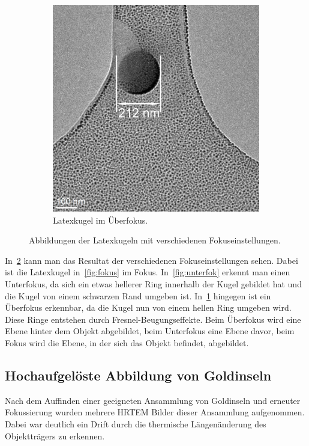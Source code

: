 \documentclass[slug=TEM, room=IFW, supervisor=?, coursedate=23.\ 01.\ 2020]{../../Lab_Report_LaTeX/lab_report}
\begin{document}
\begin{figure}[h]
	\begin{subfigure}{.29\textwidth}
		\includegraphics[width=.8\textwidth]{../messungen/Fokus_Latex/auswertung/Fokus-20m.jpg}
		\caption{Latexkugel im Überfokus.}
		\label{fig:uberfok}
	\end{subfigure}
\caption{Abbildungen der Latexkugeln mit verschiedenen Fokuseinstellungen.}
\label{fig:latex}
\end{figure}

In~\ref{fig:latex} kann man das Resultat der verschiedenen Fokuseinstellungen sehen. Dabei ist
die Latexkugel in~\ref{fig:fokus} im Fokus. In~\ref{fig:unterfok} erkennt man einen Unterfokus,
da sich ein etwas hellerer Ring innerhalb der Kugel gebildet hat und die Kugel von einem 
schwarzen Rand umgeben ist. In~\ref{fig:uberfok} hingegen ist ein Überfokus erkennbar, da die
Kugel nun von einem hellen Ring umgeben wird. Diese Ringe entstehen durch Fresnel-Beugungseffekte.
Beim Überfokus wird eine Ebene hinter dem Objekt abgebildet, beim Unterfokus eine Ebene davor,
beim Fokus wird die Ebene, in der sich das Objekt befindet, abgebildet.

\subsection{Hochaufgel\"oste Abbildung von Goldinseln}
\label{sec:hrtem}

Nach dem Auffinden einer geeigneten Ansammlung von Goldinseln und erneuter
Fokussierung wurden mehrere HRTEM Bilder dieser Ansammlung
aufgenommen. Dabei war deutlich ein Drift durch die thermische
L\"angen\"anderung des Objekttr\"agers zu erkennen.
\end{document}
